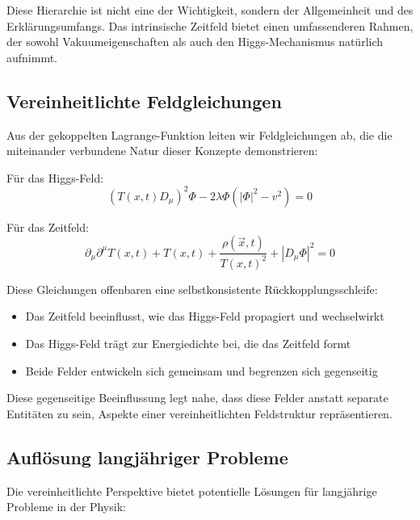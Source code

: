 \documentclass[12pt,a4paper]{article}
\newcommand{\Tfieldt}{T(x,t)}
\newcommand{\vecx}{\vec{x}}
\begin{document}
	Diese Hierarchie ist nicht eine der Wichtigkeit, sondern der Allgemeinheit und des Erklärungsumfangs. Das intrinsische Zeitfeld bietet einen umfassenderen Rahmen, der sowohl Vakuumeigenschaften als auch den Higgs-Mechanismus natürlich aufnimmt.
	
	\subsection{Vereinheitlichte Feldgleichungen}
	\label{subsec:unified_equations}
	
	Aus der gekoppelten Lagrange-Funktion leiten wir Feldgleichungen ab, die die miteinander verbundene Natur dieser Konzepte demonstrieren:
	
	Für das Higgs-Feld:
	\begin{equation}
		(\Tfieldt D_\mu)^2 \Phi - 2\lambda\Phi(|\Phi|^2 - v^2) = 0
	\end{equation}
	
	Für das Zeitfeld:
	\begin{equation}
		\partial_\mu\partial^\mu\Tfieldt + \Tfieldt + \frac{\rho(\vecx,t)}{\Tfieldt^2} + |D_\mu\Phi|^2 = 0
	\end{equation}
	
	Diese Gleichungen offenbaren eine selbstkonsistente Rückkopplungsschleife:
	\begin{itemize}
		\item Das Zeitfeld beeinflusst, wie das Higgs-Feld propagiert und wechselwirkt
		\item Das Higgs-Feld trägt zur Energiedichte bei, die das Zeitfeld formt
		\item Beide Felder entwickeln sich gemeinsam und begrenzen sich gegenseitig
	\end{itemize}
	
	Diese gegenseitige Beeinflussung legt nahe, dass diese Felder anstatt separate Entitäten zu sein, Aspekte einer vereinheitlichten Feldstruktur repräsentieren.
	
	\subsection{Auflösung langjähriger Probleme}
	\label{subsec:resolution_problems}
	
	Die vereinheitlichte Perspektive bietet potentielle Lösungen für langjährige Probleme in der Physik:
	
\end{document}
